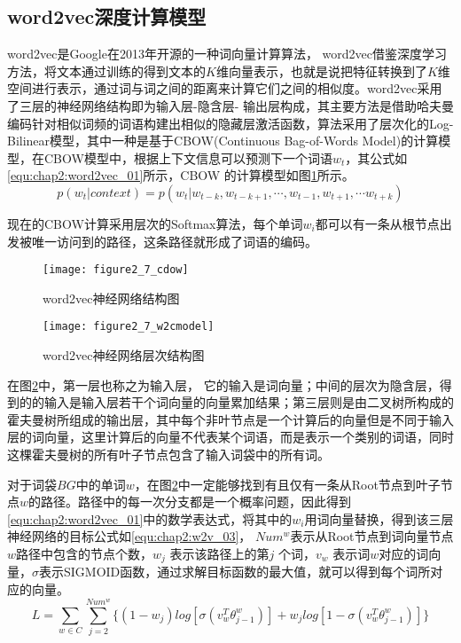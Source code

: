 \subsection{word2vec深度计算模型}
word2vec是Google在2013年开源的一种词向量计算算法， word2vec借鉴深度学习方法，将文本通过训练的得到文本的$K$维向量表示，也就是说把特征转换到了$K$维空间进行表示，通过词与词之间的距离来计算它们之间的相似度。word2vec采用了三层的神经网络结构即为输入层-隐含层- 输出层构成，其主要方法是借助哈夫曼编码针对相似词频的词语构建出相似的隐藏层激活函数，算法采用了层次化的Log-Bilinear模型，其中一种是基于CBOW(Continuous Bag-of-Words Model)的计算模型，在CBOW模型中，根据上下文信息可以预测下一个词语$w_{t}$，其公式如\ref{equ:chap2:word2vec_01}所示，CBOW 的计算模型如图\ref{fig:2_7_cdow}所示。
\begin{equation}
\label{equ:chap2:word2vec_01}
p(w_{t}|context)=p(w_{t}|w_{t-k},w_{t-k+1},\cdots ,w_{t-1},w_{t+1},\cdots w_{t+k})
\end{equation}
\par 现在的CBOW计算采用层次的Softmax算法，每个单词$w_{i}$都可以有一条从根节点出发被唯一访问到的路径，这条路径就形成了词语的编码。
\begin{figure}[htp]
\centering
\texttt{[image: figure2\_7\_cdow]}
\caption{word2vec神经网络结构图}
\label{fig:2_7_cdow}
\end{figure}
\begin{figure}[htp]
\centering
\texttt{[image: figure2\_7\_w2cmodel]}
\caption{word2vec神经网络层次结构图}
\label{fig:2_7}
\end{figure}
\par 在图\ref{fig:2_7}中，第一层也称之为输入层， 它的输入是词向量；中间的层次为隐含层，得到的的输入是输入层若干个词向量的向量累加结果；第三层则是由二叉树所构成的霍夫曼树所组成的输出层，其中每个非叶节点是一个计算后的向量但是不同于输入层的词向量，这里计算后的向量不代表某个词语，而是表示一个类别的词语，同时这棵霍夫曼树的所有叶子节点包含了输入词袋中的所有词。
\par 对于词袋$BG$中的单词$w$，在图\ref{fig:2_7}中一定能够找到有且仅有一条从Root节点到叶子节点$w$的路径。路径中的每一次分支都是一个概率问题，因此得到\ref{equ:chap2:word2vec_01}中的数学表达式，将其中的$w_{i}$用词向量替换，得到该三层神经网络的目标公式如\ref{equ:chap2:w2v_03}， $Num^{w}$表示从Root节点到词向量节点$w$路径中包含的节点个数，$w_{j}$ 表示该路径上的第$j$ 个词，$v_{w}$ 表示词$w$对应的词向量，$\sigma$表示SIGMOID函数，通过求解目标函数的最大值，就可以得到每个词所对应的向量。
\begin{equation}
\label{equ:chap2:w2v_03}
L=\sum_{w\in C}\sum_{j=2}^{Num^{w}}\{(1-w_{j})log[\sigma(v_{w}^{T}\theta_{j-1}^{w})]+w_{j}log[1-\sigma(v_{w}^{T}\theta_{j-1}^{w})]\}
\end{equation}
